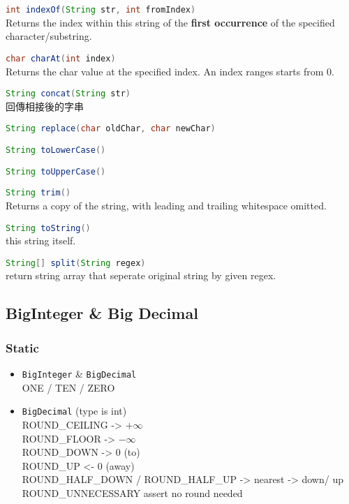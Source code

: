         \noindent
        \lstinline[language=Java]{int indexOf(String str, int fromIndex)}\\
        Returns the index within this string of the \textbf{first occurrence} of the specified character/substring.

        \noindent
        \lstinline[language=Java]{char charAt(int index)}\\
        Returns the char value at the specified index. An index ranges starts from 0.

        \noindent
        \lstinline[language=Java]{String concat(String str)}\\
        回傳相接後的字串

        \noindent
        \lstinline[language=Java]{String replace(char oldChar, char newChar)}

        \noindent
        \lstinline[language=Java]{String toLowerCase()}

        \noindent
        \lstinline[language=Java]{String toUpperCase()}

        \noindent
        \lstinline[language=Java]{String trim()}\\
        Returns a copy of the string, with leading and trailing whitespace omitted.

        \noindent
        \lstinline[language=Java]{String toString()}\\
        this string itself.


        \noindent
        \lstinline[language=Java]{String[] split(String regex)}\\
        return string array that seperate original string by given regex.

\subsection{BigInteger \& Big Decimal}

    \subsubsection{Static}
        \begin{itemize}
        \item \lstinline{BigInteger} \& \lstinline{BigDecimal}\\
        ONE / TEN / ZERO
        \item \lstinline{BigDecimal} (type is int)\\
        ROUND\_CEILING -> $+\infty$\\
        ROUND\_FLOOR -> $-\infty$\\
        ROUND\_DOWN -> $0$ (to)\\
        ROUND\_UP <- $0$ (away)\\
        ROUND\_HALF\_DOWN / ROUND\_HALF\_UP -> nearest -> down/ up\\
        ROUND\_UNNECESSARY assert no round needed\\
        \end{itemize}
